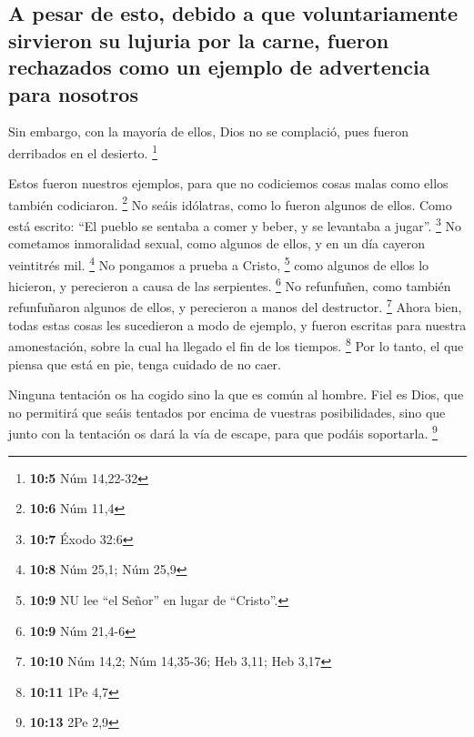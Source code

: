 \begin{paracol}{2}
\hypertarget{a-pesar-de-esto-debido-a-que-voluntariamente-sirvieron-su-lujuria-por-la-carne-fueron-rechazados-como-un-ejemplo-de-advertencia-para-nosotros}{%
\subsection{A pesar de esto, debido a que voluntariamente sirvieron su
lujuria por la carne, fueron rechazados como un ejemplo de advertencia
para
nosotros}\label{a-pesar-de-esto-debido-a-que-voluntariamente-sirvieron-su-lujuria-por-la-carne-fueron-rechazados-como-un-ejemplo-de-advertencia-para-nosotros}}

 Sin embargo, con la mayoría de ellos, Dios no se
complació, pues fueron derribados en el desierto. \footnote{\textbf{10:5}
  Núm 14,22-32}

 Estos fueron nuestros ejemplos, para que no codiciemos
cosas malas como ellos también codiciaron. \footnote{\textbf{10:6} Núm
  11,4}  No seáis idólatras, como lo fueron algunos de
ellos. Como está escrito: ``El pueblo se sentaba a comer y beber, y se
levantaba a jugar''. \footnote{\textbf{10:7} Éxodo 32:6} 
No cometamos inmoralidad sexual, como algunos de ellos, y en un día
cayeron veintitrés mil. \footnote{\textbf{10:8} Núm 25,1; Núm 25,9}
 No pongamos a prueba a Cristo, \footnote{\textbf{10:9} NU
  lee ``el Señor'' en lugar de ``Cristo''.} como algunos de ellos lo
hicieron, y perecieron a causa de las serpientes. \footnote{\textbf{10:9}
  Núm 21,4-6}  No refunfuñen, como también refunfuñaron
algunos de ellos, y perecieron a manos del destructor. \footnote{\textbf{10:10}
  Núm 14,2; Núm 14,35-36; Heb 3,11; Heb 3,17}  Ahora
bien, todas estas cosas les sucedieron a modo de ejemplo, y fueron
escritas para nuestra amonestación, sobre la cual ha llegado el fin de
los tiempos. \footnote{\textbf{10:11} 1Pe 4,7}  Por lo
tanto, el que piensa que está en pie, tenga cuidado de no caer.

 Ninguna tentación os ha cogido sino la que es común al
hombre. Fiel es Dios, que no permitirá que seáis tentados por encima de
vuestras posibilidades, sino que junto con la tentación os dará la vía
de escape, para que podáis soportarla. \footnote{\textbf{10:13} 2Pe 2,9}

\hypertarget{la-participaciuxf3n-en-idolatruxeda-y-comidas-de-sacrificio-es-incompatible-con-la-celebraciuxf3n-de-la-cena-del-seuxf1or-cristiano-y-por-lo-tanto-debe-evitarse}{%
}
\end{paracol}
